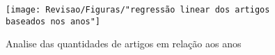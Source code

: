 \begin{figure}[htpb!]
	\centering
	\caption{Analise das quantidades de artigos em relação aos anos}
	\label{fig:regressao-linear-dos-artigos-baseados-nos-anos}
	\texttt{[image: Revisao/Figuras/"regressão linear dos artigos baseados nos anos"]}
	
\end{figure}